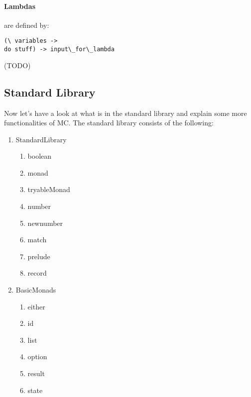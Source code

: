 





\paragraph{Lambdas}
are defined by:

\begin{lstlisting}
(\ variables ->
do stuff) -> input\_for\_lambda
\end{lstlisting}

(TODO)

\subsection{Standard Library}
Now let's have a look at what is in the standard library and explain some more functionalities of MC.
The standard library consists of the following:
\begin{multicols}{2}
   \begin{enumerate}
      \item StandardLibrary
         \begin{enumerate}
            \item boolean
            \item monad
            \item tryableMonad
            \item number
            \item newnumber
            \item match
            \item prelude
            \item record
         \end{enumerate}
      \item BasicMonads
         \begin{enumerate}
            \item either
            \item id
            \item list
            \item option
            \item result
            \item state
         \end{enumerate}
   \end{enumerate}
\end{multicols}

